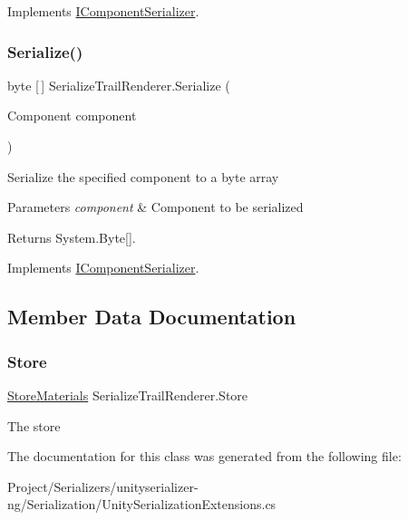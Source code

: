 Implements \hyperlink{interface_i_component_serializer_a4cc366a5c78b33d47a90c209d8fed883}{I\+Component\+Serializer}.

\mbox{\label{class_serialize_trail_renderer_ab7177e5b5343bff3444f014b3a1f88de}} 
\subsubsection{\texorpdfstring{Serialize()}{Serialize()}}
{\footnotesize\ttfamily byte \mbox{[}$\,$\mbox{]} Serialize\+Trail\+Renderer.\+Serialize (\begin{DoxyParamCaption}\item[{Component}]{component }\end{DoxyParamCaption})\hspace{0.3cm}{\ttfamily [inline]}}



Serialize the specified component to a byte array 


\begin{DoxyParams}{Parameters}
{\em component} & Component to be serialized\\
\hline
\end{DoxyParams}
\begin{DoxyReturn}{Returns}
System.\+Byte\mbox{[}\mbox{]}.
\end{DoxyReturn}


Implements \hyperlink{interface_i_component_serializer_ab2aa38005665496b62d6c54b5f0dbd31}{I\+Component\+Serializer}.



\subsection{Member Data Documentation}
\mbox{\label{class_serialize_trail_renderer_a58675d32c691c906cc9deebc07f9a238}} 
\subsubsection{\texorpdfstring{Store}{Store}}
{\footnotesize\ttfamily \hyperlink{class_serialization_1_1_store_materials}{Store\+Materials} Serialize\+Trail\+Renderer.\+Store\hspace{0.3cm}{\ttfamily [static]}}



The store 



The documentation for this class was generated from the following file\+:\begin{DoxyCompactItemize}
\item 
Project/\+Serializers/unityserializer-\/ng/\+Serialization/Unity\+Serialization\+Extensions.\+cs\end{DoxyCompactItemize}
